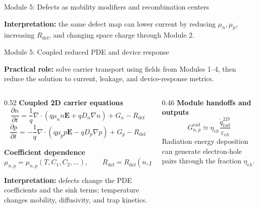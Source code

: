 \documentclass[aspectratio=169,9pt]{beamer}
\newcommand{\Evec}{\bm{E}}
\newcommand{\qrad}{\dot{q}_{\mathrm{rad}}}
\begin{document}
\begin{frame}{Module 5: Defects as mobility modifiers and recombination centers}
\vspace{1mm}
\begin{purplebox}
\centering\scriptsize
\textbf{Interpretation:} the same defect map can lower current by reducing \(\mu_n,\mu_p\), increasing \(R_{\mathrm{def}}\), and changing space charge through Module 2.
\end{purplebox}
\end{frame}


\begin{frame}{Module 5: Coupled reduced PDE and device response}
\scriptsize
\vspace{-3mm}
\begin{bluebox}
\centering
\textbf{Practical role:} solve carrier transport using fields from Modules 1--4, then reduce the solution to current, leakage, and device-response metrics.
\end{bluebox}

\vspace{0.8mm}
\begin{columns}[T,totalwidth=\textwidth]
\begin{column}{0.52\textwidth}
\textbf{Coupled 2D carrier equations}
\begin{equation*}
\boxed{
\frac{\partial n}{\partial t}
=\frac{1}{q}\nabla\cdot\left(q\mu_n n\Evec+qD_n\nabla n\right)+G_n-R_{\mathrm{def}}
}
\end{equation*}
\begin{equation*}
\boxed{
\frac{\partial p}{\partial t}
=-\frac{1}{q}\nabla\cdot\left(q\mu_p p\Evec-qD_p\nabla p\right)+G_p-R_{\mathrm{def}}
}
\end{equation*}

\vspace{0.4mm}
\textbf{Coefficient dependence}
\begin{equation*}
\boxed{\mu_{n,p}=\mu_{n,p}(T,C_1,C_2,\ldots)},
\qquad
\boxed{R_{\mathrm{def}}=R_{\mathrm{def}}(n,p,T,C_j)}
\end{equation*}
\smallskip
\begin{orangebox}
\textbf{Interpretation:} defects change the PDE coefficients and the sink terms; temperature changes mobility, diffusivity, and trap kinetics.
\end{orangebox}
\end{column}

\begin{column}{0.46\textwidth}
\textbf{Module handoffs and outputs}
\begin{equation*}
\boxed{G_{n,p}^{\mathrm{rad}}\simeq
\eta_{eh}\frac{\qrad^{2D}}{\varepsilon_{eh}}}
\end{equation*}
\small
Radiation energy deposition can generate electron-hole pairs through the fraction \(\eta_{eh}\).


\end{column}
\end{columns}
\end{frame}
\end{document}

